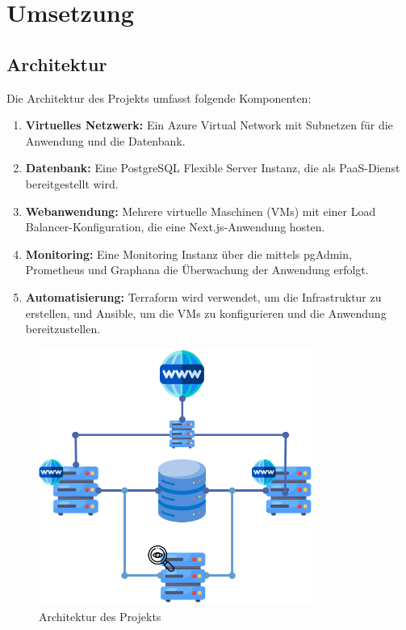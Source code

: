 
\chapter{Umsetzung}

\section{Architektur}
Die Architektur des Projekts umfasst folgende Komponenten:
\begin{enumerate}
    \item \textbf{Virtuelles Netzwerk:} Ein Azure Virtual Network mit Subnetzen für die Anwendung und die Datenbank.
    \item \textbf{Datenbank:} Eine PostgreSQL Flexible Server Instanz, die als PaaS-Dienst bereitgestellt wird.
    \item \textbf{Webanwendung:} Mehrere virtuelle Maschinen (VMs) mit einer Load Balancer-Konfiguration, die eine Next.js-Anwendung hosten.
    \item \textbf{Monitoring:} Eine Monitoring Instanz über die mittels pgAdmin, Prometheus und Graphana die Überwachung der Anwendung erfolgt.
    \item \textbf{Automatisierung:} Terraform wird verwendet, um die Infrastruktur zu erstellen, und Ansible, um die VMs zu konfigurieren und die Anwendung bereitzustellen.
\end{enumerate}

\begin{figure}[H]
    \centering
    \includegraphics[width=0.8\textwidth]{resources/images/Architektur.png}
    \caption{Architektur des Projekts}
\end{figure}

